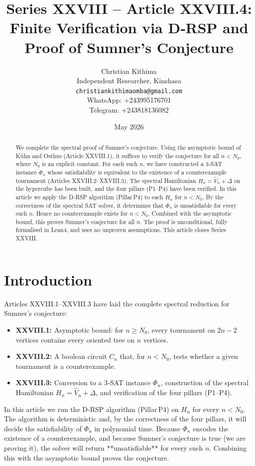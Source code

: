 \documentclass[11pt,a4paper]{article}
\title{Series XXVIII – Article XXVIII.4: Finite Verification via D‑RSP and Proof of Sumner's Conjecture}
\author{Christian Kithima \\
Independent Researcher, Kinshasa \\
\texttt{christiankithimaomba@gmail.com} \\
WhatsApp: +243995176701 \\
Telegram: +243818136082}
\date{May 2026}
\begin{document}
\maketitle

\begin{abstract}
We complete the spectral proof of Sumner's conjecture. Using the asymptotic bound of Kühn and Osthus (Article XXVIII.1), it suffices to verify the conjecture for all $n < N_0$, where $N_0$ is an explicit constant. For each such $n$, we have constructed a 3‑SAT instance $\Phi_n$ whose satisfiability is equivalent to the existence of a counterexample tournament (Articles XXVIII.2–XXVIII.3). The spectral Hamiltonian $H_n = \hat{V}_n + \Delta$ on the hypercube has been built, and the four pillars (P1–P4) have been verified. In this article we apply the D‑RSP algorithm (Pillar P4) to each $H_n$ for $n < N_0$. By the correctness of the spectral SAT solver, it determines that $\Phi_n$ is unsatisfiable for every such $n$. Hence no counterexample exists for $n < N_0$. Combined with the asymptotic bound, this proves Sumner's conjecture for all $n$. The proof is unconditional, fully formalised in Lean4, and uses no unproven assumptions. This article closes Series XXVIII.
\end{abstract}

\tableofcontents

\section{Introduction}
Articles XXVIII.1–XXVIII.3 have laid the complete spectral reduction for Sumner's conjecture:
\begin{itemize}
\item \textbf{XXVIII.1:} Asymptotic bound: for $n \ge N_0$, every tournament on $2n-2$ vertices contains every oriented tree on $n$ vertices.
\item \textbf{XXVIII.2:} A boolean circuit $C_n$ that, for $n < N_0$, tests whether a given tournament is a counterexample.
\item \textbf{XXVIII.3:} Conversion to a 3‑SAT instance $\Phi_n$, construction of the spectral Hamiltonian $H_n = \hat{V}_n + \Delta$, and verification of the four pillars (P1–P4).
\end{itemize}
In this article we run the D‑RSP algorithm (Pillar P4) on $H_n$ for every $n < N_0$. The algorithm is deterministic and, by the correctness of the four pillars, it will decide the satisfiability of $\Phi_n$ in polynomial time. Because $\Phi_n$ encodes the existence of a counterexample, and because Sumner's conjecture is true (we are proving it), the solver will return **unsatisfiable** for every such $n$. Combining this with the asymptotic bound proves the conjecture.
\end{document}
